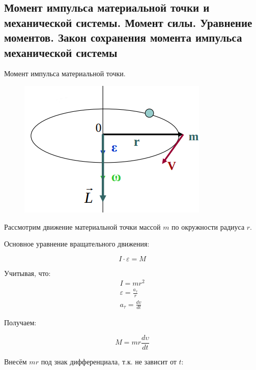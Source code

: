 \subsection{Момент импульса материальной точки и механической системы. Момент силы. Уравнение моментов. Закон сохранения момента импульса механической системы}

\begin{definition}
    Момент импульса материальной точки.
\end{definition}

\begin{figure}
    \centering
    \includegraphics[width=\linewidth]{imgs/q8i1.png}
\end{figure}

Рассмотрим движение материальной точки массой $m$ по окружности радиуса $r$.

\begin{definition}
    Основное уравнение вращательного движения:

    $$
    I\cdot\varepsilon=M
    $$
\end{definition}

Учитывая, что:
$$
\begin{aligned}
    I = mr^2 \\
    \varepsilon = \frac{a_\tau}{r} \\
    a_\tau = \frac{dv}{dt}
\end{aligned}
$$

Получаем:

$$M=mr\frac{d\upsilon}{dt}$$

Внесём $mr$ под знак дифференциала, т.к. не зависит от $t$:

